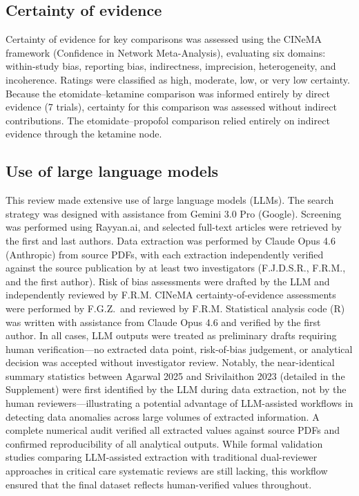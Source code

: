 \documentclass[11pt]{article}
\begin{document}
\subsection{Certainty of evidence}

Certainty of evidence for key comparisons was assessed using the CINeMA framework (Confidence in Network Meta-Analysis),\cite{nikolakopoulou2020} evaluating six domains: within-study bias, reporting bias, indirectness, imprecision, heterogeneity, and incoherence. Ratings were classified as high, moderate, low, or very low certainty. Because the etomidate--ketamine comparison was informed entirely by direct evidence (7 trials), certainty for this comparison was assessed without indirect contributions. The etomidate--propofol comparison relied entirely on indirect evidence through the ketamine node.

\subsection{Use of large language models}

This review made extensive use of large language models (LLMs). The search strategy was designed with assistance from Gemini 3.0 Pro (Google). Screening was performed using Rayyan.ai, and selected full-text articles were retrieved by the first and last authors. Data extraction was performed by Claude Opus 4.6 (Anthropic) from source PDFs, with each extraction independently verified against the source publication by at least two investigators (F.J.D.S.R., F.R.M., and the first author). Risk of bias assessments were drafted by the LLM and independently reviewed by F.R.M. CINeMA certainty-of-evidence assessments were performed by F.G.Z.\ and reviewed by F.R.M. Statistical analysis code (R) was written with assistance from Claude Opus 4.6 and verified by the first author. In all cases, LLM outputs were treated as preliminary drafts requiring human verification---no extracted data point, risk-of-bias judgement, or analytical decision was accepted without investigator review. Notably, the near-identical summary statistics between Agarwal 2025 and Srivilaithon 2023 (detailed in the Supplement) were first identified by the LLM during data extraction, not by the human reviewers---illustrating a potential advantage of LLM-assisted workflows in detecting data anomalies across large volumes of extracted information. A complete numerical audit verified all extracted values against source PDFs and confirmed reproducibility of all analytical outputs. While formal validation studies comparing LLM-assisted extraction with traditional dual-reviewer approaches in critical care systematic reviews are still lacking, this workflow ensured that the final dataset reflects human-verified values throughout.
\end{document}

